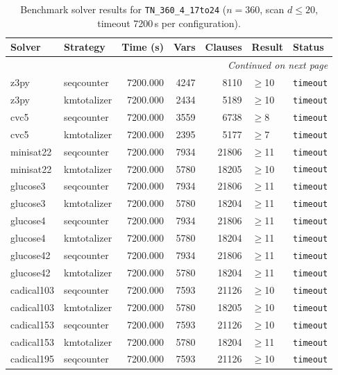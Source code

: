 \begin{longtable}{llrrrl p{}}
\caption{Benchmark solver results for \texttt{TN\_360\_4\_17to24} ($n=360$, scan $d \leq 20$, timeout 7200\,s per configuration).} \label{tab:bench-TN_360_4_17to24} \\
\toprule
Solver & Strategy & Time (s) & Vars & Clauses & Result & Status \\
\midrule
\endhead
\midrule
\multicolumn{7}{r}{\textit{Continued on next page}} \\
\midrule
\endfoot
\bottomrule
\endlastfoot
z3py & seqcounter & 7200.000 & 4247 & 8110 & $\geq$10 & \texttt{timeout} \\
z3py & kmtotalizer & 7200.000 & 2434 & 5189 & $\geq$10 & \texttt{timeout} \\
cvc5 & seqcounter & 7200.000 & 3559 & 6738 & $\geq$8 & \texttt{timeout} \\
cvc5 & kmtotalizer & 7200.000 & 2395 & 5177 & $\geq$7 & \texttt{timeout} \\
minisat22 & seqcounter & 7200.000 & 7934 & 21806 & $\geq$11 & \texttt{timeout} \\
minisat22 & kmtotalizer & 7200.000 & 5780 & 18205 & $\geq$10 & \texttt{timeout} \\
glucose3 & seqcounter & 7200.000 & 7934 & 21806 & $\geq$11 & \texttt{timeout} \\
glucose3 & kmtotalizer & 7200.000 & 5780 & 18204 & $\geq$11 & \texttt{timeout} \\
glucose4 & seqcounter & 7200.000 & 7934 & 21806 & $\geq$11 & \texttt{timeout} \\
glucose4 & kmtotalizer & 7200.000 & 5780 & 18204 & $\geq$11 & \texttt{timeout} \\
glucose42 & seqcounter & 7200.000 & 7934 & 21806 & $\geq$11 & \texttt{timeout} \\
glucose42 & kmtotalizer & 7200.000 & 5780 & 18204 & $\geq$11 & \texttt{timeout} \\
cadical103 & seqcounter & 7200.000 & 7593 & 21126 & $\geq$10 & \texttt{timeout} \\
cadical103 & kmtotalizer & 7200.000 & 5780 & 18205 & $\geq$10 & \texttt{timeout} \\
cadical153 & seqcounter & 7200.000 & 7593 & 21126 & $\geq$10 & \texttt{timeout} \\
cadical153 & kmtotalizer & 7200.000 & 5780 & 18204 & $\geq$11 & \texttt{timeout} \\
cadical195 & seqcounter & 7200.000 & 7593 & 21126 & $\geq$10 & \texttt{timeout} \\

\end{longtable}
